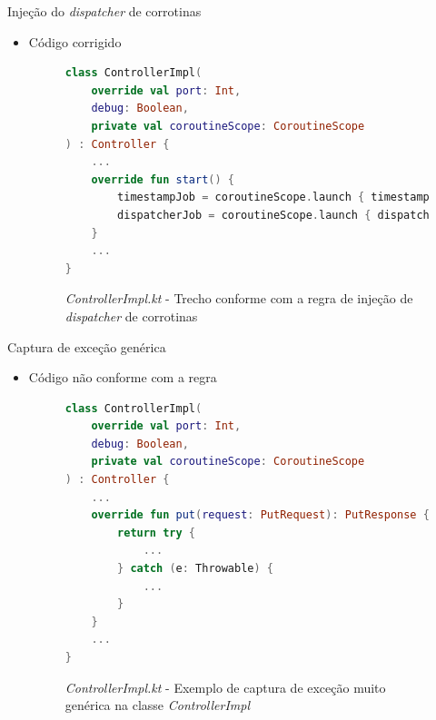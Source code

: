 \documentclass[brazilian]{beamer}
\begin{document}
\begin{frame}[fragile]{Injeção do \textit{dispatcher} de corrotinas}
    \begin{itemize}
        \item Código corrigido
        \begin{figure}[H]
    \centering
    \begin{lstlisting}[language=Kotlin]
class ControllerImpl(
    override val port: Int,
    debug: Boolean,
    private val coroutineScope: CoroutineScope
) : Controller {
    ...
    override fun start() {
        timestampJob = coroutineScope.launch { timestampRepository.run() }
        dispatcherJob = coroutineScope.launch { dispatcher.run() }
    }
    ...
}
    \end{lstlisting}
    \caption{\textit{ControllerImpl.kt} - Trecho conforme com a regra de injeção de \textit{dispatcher} de corrotinas}
    \label{fig:detekt_inject_dispatcher_after_example}
\end{figure}
    \end{itemize}
\end{frame}

\begin{frame}[fragile]{Captura de exceção genérica}
    \begin{itemize}
        \item Código não conforme com a regra
        \begin{figure}[H]
    \centering
    \begin{lstlisting}[language=Kotlin]
class ControllerImpl(
    override val port: Int,
    debug: Boolean,
    private val coroutineScope: CoroutineScope
) : Controller {
    ...
    override fun put(request: PutRequest): PutResponse {
        return try {
            ...
        } catch (e: Throwable) {
            ...
        }
    }
    ...
}
    \end{lstlisting}
    \caption{\textit{ControllerImpl.kt} - Exemplo de captura de exceção muito genérica na classe \textit{ControllerImpl}}
    \label{fig:detekt_too_generic_exception_before_example}
\end{figure}
    \end{itemize}
\end{frame}
\end{document}
